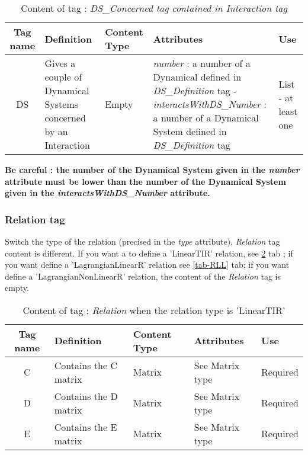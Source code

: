 \begin{table}[!hbp]
\begin{center}
\begin{tabular}{|c|p{4cm}|p{2cm}|p{5cm}|p{2cm}|}
\hline
\bf{Tag name} & \bf{Definition} & \bf{Content Type} & \bf{Attributes} & \bf{Use}
\\\hline
\hline
DS		  & Gives a couple of Dynamical Systems concerned by an Interaction & Empty & \textit{number} : a number of a Dynamical defined in \textit{DS\_Definition} tag
- \textit{interactsWithDS\_Number} : a number of a
Dynamical System defined in \textit{DS\_Definition} tag  &  List - at least one \\
\hline
\end{tabular}
\end{center}
\caption{Content of tag : \textit{DS\_Concerned tag contained in Interaction tag}}
\label{tab-IDSConcerned}
\end{table}

\textbf{Be careful : the number of the Dynamical System given in the \textit{number} attribute must be lower than the number of the Dynamical System given in the \textit{interactsWithDS\_Number} attribute.}



\subsubsection{Relation tag}
\label{RelationTag}
Switch the type of the relation (precised in the \textit{type} attribute), \textit{Relation} tag content is different.
If you want a to define a 'LinearTIR' relation, see \ref{tab-RLTI} tab ; if you want define a 'LagrangianLinearR' relation see \ref{tab-RLL} tab; if you want define a
'LagrangianNonLinearR' relation, the content of the \textit{Relation} tag is empty.



\begin{table}[!hbp]
\begin{center}
\begin{tabular}{|c|p{6cm}|p{2cm}|p{3cm}|p{2cm}|}
\hline
\bf{Tag name} & \bf{Definition} & \bf{Content Type} & \bf{Attributes} & \bf{Use}
\\\hline
C	          & Contains the C matrix & Matrix & See Matrix type &  Required \\
\hline
D	          & Contains the D matrix  & Matrix & See Matrix type &  Required \\
\hline
E	          & Contains the E matrix & Matrix & See Matrix type &  Required \\
\hline
\end{tabular}
\end{center}
\caption{Content of tag : \textit{Relation} when the relation type is 'LinearTIR'}
\label{tab-RLTI}
\end{table}


